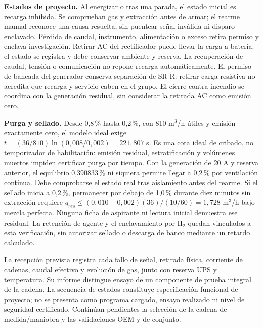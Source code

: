 \textbf{Estados de proyecto.} Al energizar o tras una parada, el estado inicial es recarga inhibida. Se comprueban gas y extracción antes de armar; el rearme manual reconoce una causa resuelta, sin puentear señal inválida ni disparo enclavado. Pérdida de caudal, instrumento, alimentación o exceso retira permiso y enclava investigación. Retirar AC del rectificador puede llevar la carga a batería: el estado se registra y debe conservar ambiente y reserva. La recuperación de caudal, tensión o comunicación no repone recarga automáticamente. El permiso de bancada del generador conserva separación de SR-R: retirar carga resistiva no acredita que recarga y servicio caben en el grupo. El cierre contra incendio se coordina con la generación residual, sin considerar la retirada AC como emisión cero.

\textbf{Purga y sellado.} Desde 0,8\,\% hasta 0,2\,\%, con 810 m$^3$/h útiles y emisión exactamente cero, el modelo ideal exige $t=(36/810)\ln(0,008/0,002)=221,807$ s. Es una cota ideal de cribado, no temporizador de habilitación: emisión residual, estratificación y volúmenes muertos impiden certificar purga por tiempo. Con la generación de 20 A y reserva anterior, el equilibrio 0,390833\,\% ni siquiera permite llegar a 0,2\,\% por ventilación continua. Debe comprobarse el estado real tras aislamiento antes del rearme. Si el sellado inicia a 0,2\,\%, permanecer por debajo de 1,0\,\% durante diez minutos sin extracción requiere $q_{res}\leq(0,010-0,002)(36)/(10/60)=1,728$ m$^3$/h bajo mezcla perfecta. Ninguna ficha de aspirante ni lectura inicial demuestra ese residual. La retención de agente y el enclavamiento por H$_2$ quedan vinculados a esta verificación, sin autorizar sellado o descarga de banco mediante un retardo calculado.

La recepción prevista registra cada fallo de señal, retirada física, corriente de cadenas, caudal efectivo y evolución de gas, junto con reserva UPS y temperatura. Su informe distingue ensayo de un componente de prueba integral de la cadena. La secuencia de estados constituye especificación funcional de proyecto; no se presenta como programa cargado, ensayo realizado ni nivel de seguridad certificado. Continúan pendientes la selección de la cadena de medida/maniobra y las validaciones OEM y de conjunto.

